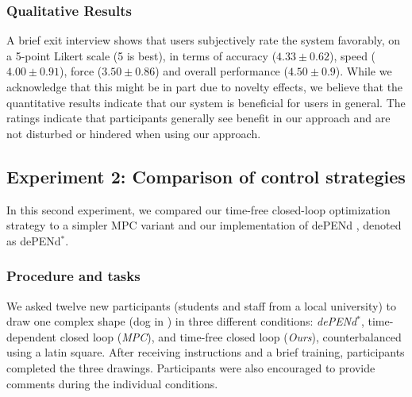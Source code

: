 \subsubsection*{Qualitative Results}
A brief exit interview shows that users subjectively rate the system favorably, on a 5-point Likert scale (5 is best), in terms of accuracy ($4.33 \pm0.62$), speed ($4.00\pm0.91$), force ($3.50\pm0.86$) and overall performance ($4.50\pm0.9$).
While we acknowledge that this might be in part due to novelty effects, we believe that the quantitative results indicate that our system is beneficial for users in general.
The ratings indicate that participants generally see benefit in our approach and are not disturbed or hindered when using our approach.


\subsection{Experiment 2: Comparison of control strategies}
\label{Sc:preliminary_user_evaluation}
In this second experiment, we compared our time-free closed-loop optimization strategy to a simpler MPC variant and our implementation of dePENd \cite{yamaoka2013depend}, denoted as dePENd$^{*}$. 

\subsubsection{Procedure and tasks}
We asked twelve new participants (students and staff from a local university) to draw one complex shape (dog in ) in three different conditions: \emph{dePENd$^{*}$}, time-dependent closed loop (\emph{MPC}), and time-free closed loop (\emph{Ours}), counterbalanced using a latin square. 
After receiving instructions and a brief training, participants completed the three drawings.
Participants were also encouraged to provide comments during the individual conditions.

